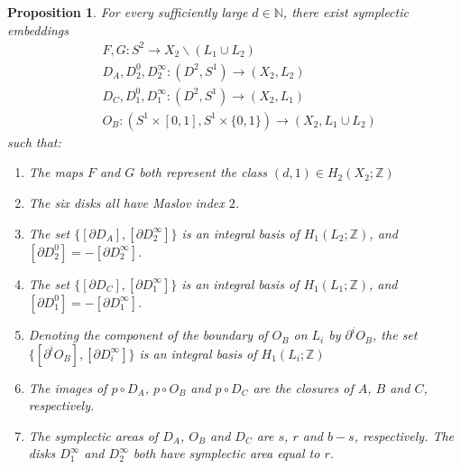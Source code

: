 \documentclass[12pt]{amsart}
\newtheorem{proposition}[theorem]{Proposition}
\theoremstyle{definition}
\newcommand{\ZZ}{{\mathbb Z}}
\newcommand{\NN}{{\mathbb N}}
\begin{document}
\begin{proposition}\label{prop:submanifolds}
For every sufficiently large $d \in \NN$, there exist symplectic embeddings
\begin{align*}
    &F,G \colon S^2 \to X_2 \smallsetminus (L_1 \cup L_2) \\
    &D_A, D^0_2, D^\infty_2 \colon  (D^2,S^1) \to (X_2,L_2) \\
    &D_C, D^0_1, D^\infty_1 \colon  (D^2,S^1) \to (X_2,L_1) \\
    &O_B \colon (S^1 \times [0,1],S^1 \times \{0,1\}) \to (X_2,L_1 \cup L_2)
\end{align*}
such that:\\

\begin{enumerate}

\item  The maps $F$ and $G$ both represent the class $(d,1) \in H_2(X_2; \ZZ)$\\

\item The six disks all have Maslov index $2$.\\



\item The set $\{[\partial D_A], [\partial D^\infty_2]\}$ is an integral basis of $H_1(L_2;\ZZ)$, and $[\partial  D^0_2]=-[\partial  D^\infty_2]$.\\

\item The set $\{[\partial D_C], [ \partial D^\infty_1]\}$ is an integral basis of $H_1(L_1;\ZZ)$, and $[\partial  D^0_1]=-[\partial D^\infty_1]$.\\

\item Denoting the component of the boundary of $O_B$ on $L_i$ by $\partial^i O_B$, the set $\{[\partial^i O_B], [\partial D^\infty_i]\}$ is an integral basis of $H_1(L_i;\ZZ)$\\



\item The images of  $p \circ D_A$, $p \circ O_B$ and  $p \circ D_C$ are the closures of $A$, $B$ and $C$, respectively.\\

\item The symplectic areas of  $D_A$, $O_B$ and  $D_C$ are $s$, $r$ and $b-s$, respectively. The disks $D^\infty_1$ and $D^\infty_2$ both have symplectic area equal to $r$.\\


\end{enumerate}
\end{proposition}
\end{document}
